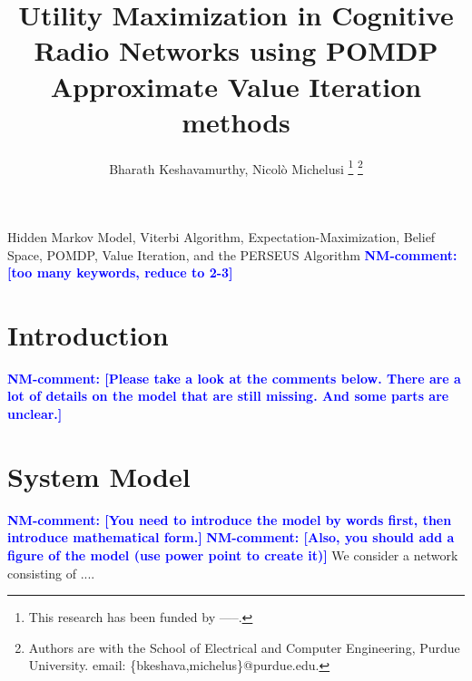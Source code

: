 \documentclass[conference]{IEEEtran}
\newcommand{\nm}[1]{\textcolor{blue}{\textbf{NM-comment: [#1]}}}
\newcommand{\add}[1]{{\color{red}#1}}
\begin{document}
\thispagestyle{empty}
\pagestyle{empty}

\title{Utility Maximization in Cognitive Radio Networks using POMDP Approximate Value Iteration methods}

\author{Bharath Keshavamurthy, Nicol\`{o} Michelusi
\thanks{This research has been funded by -----.}
\thanks{Authors are with the School of Electrical and Computer Engineering, Purdue University. email: \{bkeshava,michelus\}@purdue.edu.}
}


\maketitle

\begin{abstract}
\end{abstract}

\begin{IEEEkeywords}
Hidden Markov Model, Viterbi Algorithm, Expectation-Maximization, Belief Space, POMDP, Value Iteration, and the PERSEUS Algorithm
\nm{too many keywords, reduce to 2-3}
\end{IEEEkeywords}

\section{Introduction}

\nm{Please take a look at the comments below. There are a lot of details on the model that are still missing. And some parts are unclear.}

\section{System Model}
\nm{You need to introduce the model by words first, then introduce mathematical form.}
\nm{Also, you should add a figure of the model (use power point to create it)}
\add{We consider a network consisting of ....}
\end{document}

